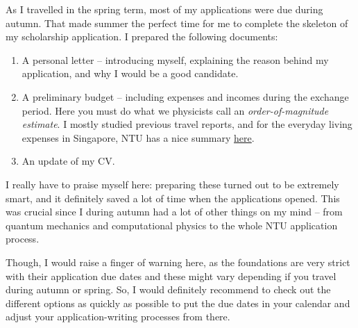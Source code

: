 As I travelled in the spring term, most of my applications were due during autumn. That made summer the perfect time for me to complete the skeleton of my scholarship application. I prepared the following documents:
\begin{enumerate}
    \item A personal letter -- introducing myself, explaining the reason behind my application, and why I would be a good candidate.
    \item A preliminary budget -- including expenses and incomes during the exchange period. Here you must do what we physicists call an \textit{order-of-magnitude estimate}. I mostly studied previous travel reports, and for the everyday living expenses in Singapore, NTU has a nice summary \href{https://www.ntu.edu.sg/eee/admissions/programmes/graduate-programmes/international-students}{here}.
    \item An update of my CV.
\end{enumerate}
\vspace{-0.3cm}
I really have to praise myself here: preparing these turned out to be extremely smart, and it definitely saved a lot of time when the applications opened. This was crucial since I during autumn had a lot of other things on my mind -- from quantum mechanics and computational physics to the whole NTU application process.

Though, I would raise a finger of warning here, as the foundations are very strict with their application due dates and these might vary depending if you travel during autumn or spring. So, I would definitely recommend to check out the different options as quickly as possible to put the due dates in your calendar and adjust your application-writing processes from there.

\hrulefill

